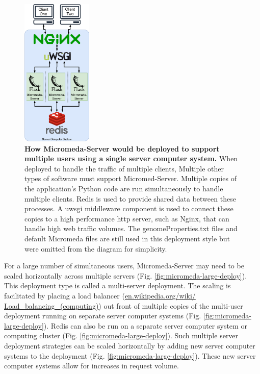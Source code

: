 \begin{figure}[!ht]
  \centering
	\includegraphics[width=0.30\textwidth]{media/micromeda-medium-deployment.pdf}
	 \caption[How Micromeda-Server would be deployed to support multiple users 
using a single server computer system.]{\textbf{How Micromeda-Server would be 
deployed to support multiple users using a single server computer system.} When 
deployed to handle the traffic of multiple clients, Multiple other types of 
software must support Micromed-Server. Multiple copies of the application's 
Python code are run simultaneously to handle multiple clients. Redis is used to 
provide shared data between these processes. A \gls{uwsgi} middleware component 
is used to connect these copies to a high performance \gls{http} server, such as 
Nginx, that can handle high web traffic volumes. The genomeProperties.txt files 
and default Micromeda files are still used in this deployment style but were 
omitted from the diagram for simplicity.}
	 \label{fig:micromeda-medium-deploy}
\end{figure}

\pagebreak

For a large number of simultaneous users, Micromeda-Server may need to be scaled 
horizontally across multiple servers (Fig. \ref{fig:micromeda-large-deploy}). 
This deployment type is called a multi-server deployment. The scaling is 
facilitated by placing a load balancer 
(\href{http://en.wikipedia.org/wiki/Load_balancing_(computing)}{en.wikipedia.org/wiki/ 
Load\_balancing\_(computing)}) out front of multiple copies of the multi-user 
deployment running on separate server computer systems (Fig. 
\ref{fig:micromeda-large-deploy}). Redis can also be run on a separate server 
computer system or computing cluster (Fig. \ref{fig:micromeda-large-deploy}). 
Such multiple server deployment strategies can be scaled horizontally by adding 
new server computer systems to the deployment (Fig. 
\ref{fig:micromeda-large-deploy}). These new server computer systems allow for 
increases in request volume.

